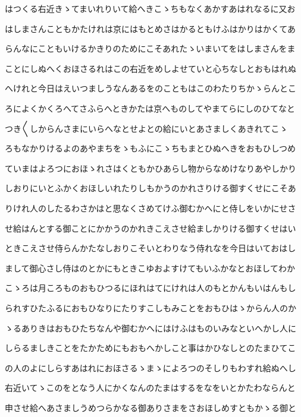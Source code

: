 \documentclass[a4paper,11pt,landscape]{ltjtarticle}
\begin{document}
はつくる右近きゝてまいれりいて給へきこゝちもなくあかすあはれなるに又お
\par\medskip
はしまさんこともかたけれは京にはもとめさはかるともけふはかりはかくてあ
\par\medskip
らんなにこともいけるかきりのためにこそあれたゝいまいてをはしまさんをま
\par\medskip
ことにしぬへくおほさるれはこの右近をめしよせていと心ちなしとおもはれぬ
\par\medskip
へけれと今日はえいつましうなんあるをのこともはこのわたりちかゝらんとこ
\par\medskip
ろによくかくろへてさふらへときかたは京へものしてやまてらにしのひてなと
\par\medskip
つき〱しからんさまにいらへなとせよとの給にいとあさましくあきれてこゝ
\par\medskip
ろもなかりけるよのあやまちをゝもふにこゝちもまとひぬへきをおもひしつめ
\par\medskip
ていまはよろつにおほゝれさはくともかひあらし物からなめけなりあやしかり
\par\medskip
しおりにいとふかくおほしいれたりしもかうのかれさりける御すくせにこそあ
\par\medskip
りけれ人のしたるわさかはと思なくさめてけふ御むかへにと侍しをいかにせさ
\par\medskip
せ給はんとする御ことにかかうのかれきこえさせ給ましかりける御すくせはい
\par\medskip
ときこえさせ侍らんかたなしおりこそいとわりなう侍れなを今日はいておはし
\par\medskip
まして御心さし侍はのとかにもときこゆおよすけてもいふかなとおほしてわか
\par\medskip
こゝろは月ころものおもひつるにほれはてにけれは人のもとかんもいはんもし
\par\medskip
られすひたふるにおもひなりにたりすこしもみことをおもひはゝからん人のか
\par\medskip
ゝるありきはおもひたちなんや御むかへにはけふはものいみなといへかし人に
\par\medskip
しらるましきことをたかためにもおもへかしこと事はかひなしとのたまひてこ
\par\medskip
の人のよにしらすあはれにおほさるゝまゝによろつのそしりもわすれ給ぬへし
\par\medskip
右近いてゝこのをとなう人にかくなんのたまはするをなをいとかたわならんと
\par\medskip
申させ給へあさましうめつらかなる御ありさまをさおほしめすともかゝる御と
\par\medskip
\end{document}
